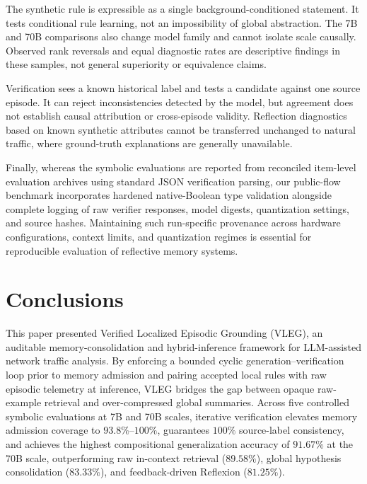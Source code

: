 \documentclass[journal]{IEEEtran}
\theoremstyle{definition}
\theoremstyle{remark}
\begin{document}
The synthetic rule is expressible as a single background-conditioned statement. It tests conditional rule learning, not an impossibility of global abstraction. The 7B and 70B comparisons also change model family and cannot isolate scale causally. Observed rank reversals and equal diagnostic rates are descriptive findings in these samples, not general superiority or equivalence claims.

Verification sees a known historical label and tests a candidate against one source episode. It can reject inconsistencies detected by the model, but agreement does not establish causal attribution or cross-episode validity. Reflection diagnostics based on known synthetic attributes cannot be transferred unchanged to natural traffic, where ground-truth explanations are generally unavailable.

Finally, whereas the symbolic evaluations are reported from reconciled item-level evaluation archives using standard JSON verification parsing, our public-flow benchmark incorporates hardened native-Boolean type validation alongside complete logging of raw verifier responses, model digests, quantization settings, and source hashes. Maintaining such run-specific provenance across hardware configurations, context limits, and quantization regimes is essential for reproducible evaluation of reflective memory systems.

\FloatBarrier
\section{Conclusions}
This paper presented Verified Localized Episodic Grounding (VLEG), an auditable memory-consolidation and hybrid-inference framework for LLM-assisted network traffic analysis. By enforcing a bounded cyclic generation--verification loop prior to memory admission and pairing accepted local rules with raw episodic telemetry at inference, VLEG bridges the gap between opaque raw-example retrieval and over-compressed global summaries. Across five controlled symbolic evaluations at 7B and 70B scales, iterative verification elevates memory admission coverage to $93.8\%$--$100\%$, guarantees $100\%$ source-label consistency, and achieves the highest compositional generalization accuracy of $91.67\%$ at the 70B scale, outperforming raw in-context retrieval ($89.58\%$), global hypothesis consolidation ($83.33\%$), and feedback-driven Reflexion ($81.25\%$).
\end{document}
